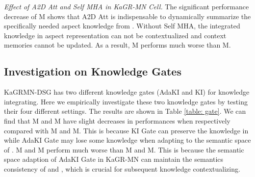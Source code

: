 \textit{Effect of A2D Att and Self MHA in KaGR-MN Cell.}
The significant performance decrease of M shows that A2D Att is indispensable to dynamically summarize the specifically needed aspect knowledge from .
Without Self MHA, the integrated knowledge in aspect representation can not be contextualized and context memories cannot be updated.
As a result, M performs much worse than M.







\subsection{Investigation on Knowledge Gates} \label{sec: gate}
\begin{table*}[t]
\fontsize{8}{11}\selectfont
\centering
\caption{Results of different knowledge gate settings.}
\label{table: gate}
\end{table*}
KaGRMN-DSG has two different knowledge gates (AdaKI and KI) for knowledge integrating.
Here we empirically investigate these two knowledge gates by testing their four different settings.
The results are shown in Table \ref{table: gate}.
We can find that M and M have slight decreases in performances when respectively compared with M and M.
This is because KI Gate can preserve the knowledge in  while AdaKI Gate may lose some knowledge when adapting to the semantic space of .
M and M perform much worse than M and M.
This is because the semantic space adaption of AdaKI Gate in KaGR-MN can maintain the semantics consistency of  and , which is crucial for subsequent knowledge contextualizing.



